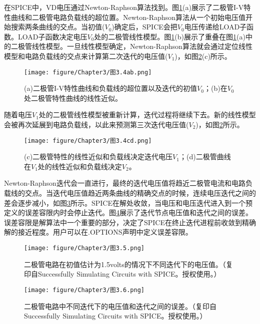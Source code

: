 在SPICE中，VD电压通过Newton-Raphson算法找到。图\ref{图3.4ab}(a)展示了二极管I-V特性曲线和二极管电路负载线的超位置。Newton-Raphson算法从一个初始电压值开始搜索两条曲线的交点。当初值($V_0$)确定后，SPICE会把$V_0$电压传递给LOAD子函数。LOAD子函数决定电压$V_0$处的二极管线性模型。图\ref{图3.4ab}(b)展示了重叠在图\ref{图3.4ab}(a)中的二极管线性模型。一旦线性模型确定，Newton-Raphson算法就会通过定位线性模型和电路负载线的交点来计算第二次迭代的电压值($V_1$)，如图\ref{图3.4cd}(c)所示。
\begin{figure}[htbp]
\small
    \centering
    \texttt{[image: figure/Chapter3/图3.4ab.png]}
    \caption{(a)二极管I-V特性曲线和负载线的超位置以及迭代的初值$V_0$；(b)在$V_0$处二极管特性曲线的线性近似。}
    \label{图3.4ab}
\end{figure}

随着电压$V_1$处的二极管线性模型被重新计算，迭代过程将继续下去。新的线性模型会被再次延展到电路负载线，以此来预测第三次迭代电压值($V_2$)，如图\ref{图3.4cd}所示。
\begin{figure}[htbp]
\small
    \centering
    \texttt{[image: figure/Chapter3/图3.4cd.png]}
    \caption{(c)二极管特性的线性近似和负载线决定迭代电压$V_1$；(d)二极管曲线在$V_1$处的线性近似和负载线决定$V_2$。}
    \label{图3.4cd}
\end{figure}

Newton-Raphson迭代会一直进行，最终的迭代电压值将趋近二极管电流和电路负载线的交点。当迭代电压值趋近两条曲线的精确交点的时候，连续电压迭代之间的差会逐步减小，如图\ref{图3.5}所示。SPICE在解处收敛，当电压和电压迭代进入到一个预定义的误差容限内时会停止迭代。图\ref{图3.6}展示了迭代节点电压值和迭代之间的误差。误差容限是解算法中一个重要的部分，决定了SPICE在终止迭代进程前收敛到精确解的接近程度。用户可以在.OPTIONS声明中定义误差容限。
\begin{figure}[htbp]
\small
    \centering
    \texttt{[image: figure/Chapter3/图3.5.png]}
    \caption{二极管电路在初值估计为1.5volts的情况下不同迭代下的电压值。（复印自Successfully Simulating Circuits with SPICE。授权使用。）}
    \label{图3.5}
\end{figure}

\begin{figure}[htbp]
\small
    \centering
    \texttt{[image: figure/Chapter3/图3.6.png]}
    \caption{二极管电路中不同迭代下的电压值和迭代之间的误差。（复印自Successfully Simulating Circuits with SPICE。授权使用。）}
    \label{图3.6}
\end{figure}

